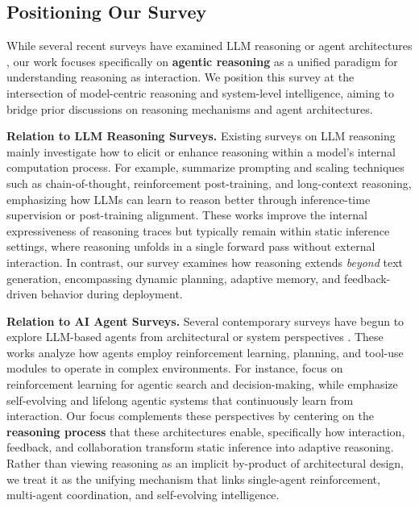 \subsection{Positioning Our Survey}

While several recent surveys have examined LLM reasoning or agent architectures \citep{huang2022towards, chen2025towards, xu2025towards, ke2025survey, zhang2025survey, zhang2025landscape, lin2025comprehensive, fang2025comprehensive, gao2025survey}, our work focuses specifically on \textbf{agentic reasoning} as a unified paradigm for understanding reasoning as interaction. We position this survey at the intersection of model-centric reasoning and system-level intelligence, aiming to bridge prior discussions on reasoning mechanisms and agent architectures.

\textbf{Relation to LLM Reasoning Surveys.}
Existing surveys on LLM reasoning mainly investigate how to elicit or enhance reasoning within a model’s internal computation process.
For example, \citet{huang2022towards, chen2025towards, xu2025towards, ke2025survey} summarize prompting and scaling techniques such as chain-of-thought, reinforcement post-training, and long-context reasoning, emphasizing how LLMs can learn to reason better through inference-time supervision or post-training alignment.
These works improve the internal expressiveness of reasoning traces but typically remain within static inference settings, where reasoning unfolds in a single forward pass without external interaction.
In contrast, our survey examines how reasoning extends \emph{beyond} text generation, encompassing dynamic planning, adaptive memory, and feedback-driven behavior during deployment.

\textbf{Relation to AI Agent Surveys.}
Several contemporary surveys have begun to explore LLM-based agents from architectural or system perspectives \citep{zhang2025landscape, lin2025comprehensive, fang2025comprehensive, gao2025survey}.
These works analyze how agents employ reinforcement learning, planning, and tool-use modules to operate in complex environments.
For instance, \citet{zhang2025landscape, lin2025comprehensive} focus on reinforcement learning for agentic search and decision-making, while \citet{fang2025comprehensive, gao2025survey} emphasize self-evolving and lifelong agentic systems that continuously learn from interaction.
Our focus complements these perspectives by centering on the \textbf{reasoning process} that these architectures enable, specifically how interaction, feedback, and collaboration transform static inference into adaptive reasoning.
Rather than viewing reasoning as an implicit by-product of architectural design, we treat it as the unifying mechanism that links single-agent reinforcement, multi-agent coordination, and self-evolving intelligence.

